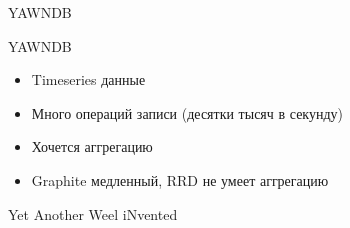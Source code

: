 \documentclass[10pt]{beamer}
\begin{document}
\begin{frame}[plain]
\end{frame}

\begin{frame}
  \begin{center}
    \Large
    YAWNDB
  \end{center}
\end{frame}

\begin{frame}{YAWNDB}
  \begin{itemize}
  \item Timeseries данные
  \item Много операций записи (десятки тысяч в секунду)
  \item Хочется аггрегацию
  \item Graphite медленный, RRD не умеет аггрегацию
  \end{itemize}
  Yet Another Weel iNvented
\end{frame}
\end{document}
